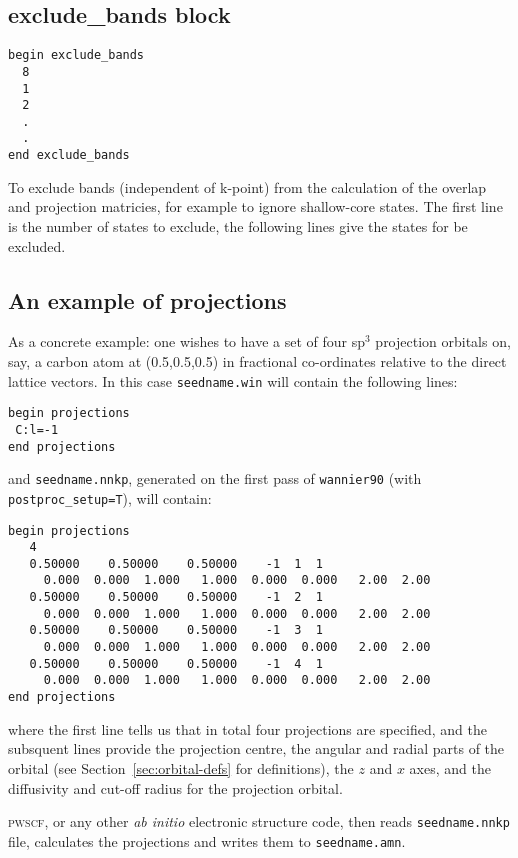 \subsection{exclude\_bands block}
\begin{verbatim}
begin exclude_bands 
  8 
  1 
  2 
  .
  .
end exclude_bands
\end{verbatim}
To exclude bands (independent of k-point) from the calculation of the 
overlap and projection matricies, for example to ignore shallow-core states.
The first line is the number of states to exclude, the following lines give
the states for be excluded.


\subsection{An example of projections}\label{sec:proj_example}

As a concrete example: one wishes to have a set of four sp$^3$ projection
orbitals on, say, a carbon atom at (0.5,0.5,0.5) in fractional
co-ordinates relative to the direct lattice vectors. In this case
\verb#seedname.win# will contain the following lines:

\begin{verbatim}
begin projections
 C:l=-1
end projections
\end{verbatim}

and \verb#seedname.nnkp#, generated on the first pass of
\verb#wannier90# (with \verb#postproc_setup=T#), will contain: 

\begin{verbatim}
begin projections
   4
   0.50000    0.50000    0.50000    -1  1  1
     0.000  0.000  1.000   1.000  0.000  0.000   2.00  2.00
   0.50000    0.50000    0.50000    -1  2  1
     0.000  0.000  1.000   1.000  0.000  0.000   2.00  2.00
   0.50000    0.50000    0.50000    -1  3  1
     0.000  0.000  1.000   1.000  0.000  0.000   2.00  2.00
   0.50000    0.50000    0.50000    -1  4  1
     0.000  0.000  1.000   1.000  0.000  0.000   2.00  2.00
end projections
\end{verbatim}

where the first line tells us that in total four projections are
specified, and the subsquent lines provide the projection centre, the
angular and radial parts of the orbital (see
Section~\ref{sec:orbital-defs} for definitions), the $z$ and $x$ axes,
and the diffusivity and cut-off radius for the projection orbital.

\textsc{pwscf}, or any other \textit{ab initio} electronic structure
code, then reads \verb#seedname.nnkp# file, calculates the projections
and writes them to \verb#seedname.amn#. 




